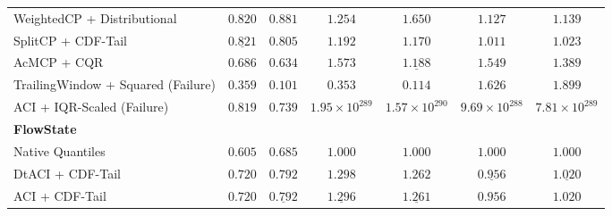 \documentclass[12pt, a4paper]{article}
\begin{document}
\begin{table}[ht]
{\begin{tabular}{lcccccc}
			WeightedCP + Distributional        & \(\mathbf{0.820}\)                        & \(0.881\)                                       & \(1.254\)                                         & \(1.650\)                & \(1.127\)                & \(1.139\)                \\
			SplitCP + CDF-Tail                 & \(\underline{0.821}\)                     & \(\mathbf{0.805}\)                              & \(\mathbf{1.192}\)                                & \(\mathbf{1.170}\)       & \(\mathbf{1.011}\)       & \(\mathbf{1.023}\)       \\
			AcMCP + CQR                        & \(0.686\)                                 & \(0.634\)                                       & \(1.573\)                                         & \(\underline{1.188}\)    & \(1.549\)                & \(1.389\)                \\
			TrailingWindow + Squared (Failure) & \(0.359\)                                 & \(0.101\)                                       & \(0.353\)                                         & \(0.114\)                & \(1.626\)                & \(1.899\)                \\
			ACI + IQR-Scaled (Failure)         & \(0.819\)                                 & \(0.739\)                                       & \(1.95 \times 10^{289}\)                          & \(1.57 \times 10^{290}\) & \(9.69 \times 10^{288}\) & \(7.81 \times 10^{289}\) \\
			\hline
			\multicolumn{7}{l}{\textbf{FlowState}}                                                                                                                                                                                                                                \\
			Native Quantiles                   & \(0.605\)                                 & \(0.685\)                                       & \(1.000\)                                         & \(1.000\)                & \(1.000\)                & \(1.000\)                \\
			\hline
			DtACI + CDF-Tail                   & \(0.720\)                                 & \(\mathbf{0.792}\)                              & \(1.298\)                                         & \(1.262\)                & \(\underline{0.956}\)    & \(\underline{1.020}\)    \\
			ACI + CDF-Tail                     & \(0.720\)                                 & \(\underline{0.792}\)                           & \(\underline{1.296}\)                             & \(\underline{1.261}\)    & \(\mathbf{0.956}\)       & \(1.020\)                \\

\end{tabular}}
\end{table}
\end{document}
